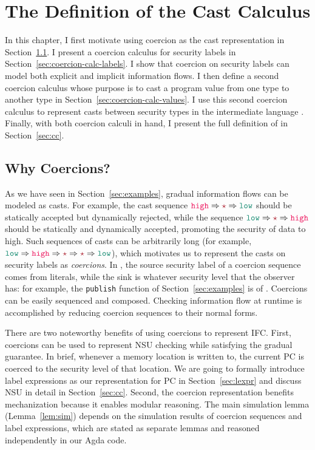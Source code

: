 \chapter{The Definition of the Cast Calculus \CC}
\label{ch:sem}

{\color{NavyBlue} %
In this chapter, I first motivate using coercion as the cast representation in
Section~\ref{sec:why-coercions}. I present a coercion calculus for security
labels in Section~\ref{sec:coercion-calc-labels}. I show that coercion on
security labels can model both explicit and implicit information flows. I then
define a second coercion calculus whose purpose is to cast a program value from
one type to another type in Section~\ref{sec:coercion-calc-values}. I use this
second coercion calculus to represent casts between security types in the
intermediate language \CC. Finally, with both coercion calculi in hand, I
present the full definition of \CC in Section~\ref{sec:cc}.

\section{Why Coercions?}
\label{sec:why-coercions}

As we have seen in Section~\ref{sec:examples}, gradual information flows can be
modeled as casts. For example, the cast sequence $\high \Rightarrow \unk
\Rightarrow \low$ should be statically accepted but dynamically rejected, while
the sequence $\low \Rightarrow \unk \Rightarrow \high$ should be statically and
dynamically accepted, promoting the security of data to high. Such sequences of
casts can be arbitrarily long (for example, $\low \Rightarrow \high \Rightarrow
\unk \Rightarrow \unk \Rightarrow \low$), which motivates us to represent the
casts on security labels as \textit{coercions}. In \Surface, the source security
label of a coercion sequence comes from literals, while the sink is whatever
security level that the observer has: for example, the \texttt{publish} function
of Section~\ref{sec:examples} is of \low. Coercions can be easily sequenced and
composed. Checking information flow at runtime is accomplished by reducing
coercion sequences to their normal forms.

There are two noteworthy benefits of using coercions to represent IFC. First,
coercions can be used to represent NSU checking while satisfying the gradual
guarantee. In brief, whenever a memory location is written to, the current PC is
coerced to the security level of that location. We are going to formally
introduce label expressions as our representation for PC in
Section~\ref{sec:lexpr} and discuss NSU in detail in Section~\ref{sec:cc}.
Second, the coercion representation benefits mechanization because it enables
modular reasoning. The main simulation lemma (Lemma~\ref{lem:sim}) depends on
the simulation results of coercion sequences and label expressions, which are
stated as separate lemmas and reasoned independently in our Agda code.

} %

